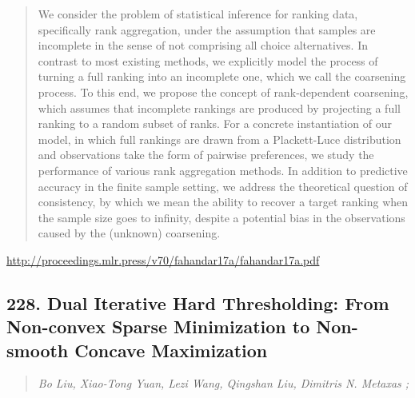 \documentclass{article}
\begin{document}
\begin{quote}
    We consider the problem of statistical inference for ranking data, specifically rank aggregation, under the assumption that samples are incomplete in the sense of not comprising all choice alternatives. In contrast to most existing methods, we explicitly model the process of turning a full ranking into an incomplete one, which we call the coarsening process. To this end, we propose the concept of rank-dependent coarsening, which assumes that incomplete rankings are produced by projecting a full ranking to a random subset of ranks. For a concrete instantiation of our model, in which full rankings are drawn from a Plackett-Luce distribution and observations take the form of pairwise preferences, we study the performance of various rank aggregation methods. In addition to predictive accuracy in the finite sample setting, we address the theoretical question of consistency, by which we mean the ability to recover a target ranking when the sample size goes to infinity, despite a potential bias in the observations caused by the (unknown) coarsening.  
\end{quote}

\href{http://proceedings.mlr.press/v70/fahandar17a/fahandar17a.pdf}{http://proceedings.mlr.press/v70/fahandar17a/fahandar17a.pdf}

\subsection{228. Dual Iterative Hard Thresholding: From Non-convex Sparse Minimization to Non-smooth Concave Maximization}

\begin{quote}
\footnotesize{\textit{Bo Liu, Xiao-Tong Yuan, Lezi Wang, Qingshan Liu, Dimitris N. Metaxas ;}}

\end{quote}
\end{document}
